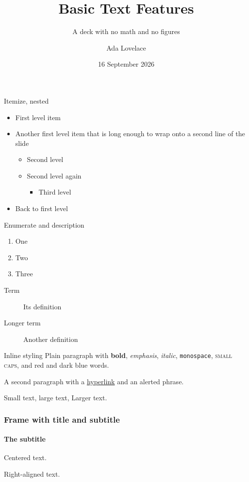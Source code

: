 \documentclass{beamer}
\title{Basic Text Features}
\subtitle{A deck with no math and no figures}
\author{Ada Lovelace}
\institute{Analytical Engine Society}
\date{16 September 2026}
\begin{document}
\begin{frame}
  \titlepage
\end{frame}

\begin{frame}{Itemize, nested}
  \begin{itemize}
    \item First level item
    \item Another first level item that is long enough to wrap onto a second line of the slide
      \begin{itemize}
        \item Second level
        \item Second level again
          \begin{itemize}
            \item Third level
          \end{itemize}
      \end{itemize}
    \item Back to first level
  \end{itemize}
\end{frame}

\begin{frame}{Enumerate and description}
  \begin{enumerate}
    \item One
    \item Two
    \item Three
  \end{enumerate}
  \begin{description}
    \item[Term] Its definition
    \item[Longer term] Another definition
  \end{description}
\end{frame}

\begin{frame}{Inline styling}
  Plain paragraph with \textbf{bold}, \emph{emphasis}, \textit{italic},
  \texttt{monospace}, \textsc{small caps}, and {\color{red}red} and
  {\color{blue!60!black}dark blue} words.

  \vspace{1em}
  A second paragraph with a \href{https://example.com}{hyperlink} and an
  \alert{alerted phrase}.

  \vspace{1em}
  {\small Small text,} {\large large text,} {\Large Larger text.}
\end{frame}

\begin{frame}
  \frametitle{Frame with title and subtitle}
  \framesubtitle{The subtitle}
  \centering
  Centered text.

  \raggedleft
  Right-aligned text.
\end{frame}
\end{document}
